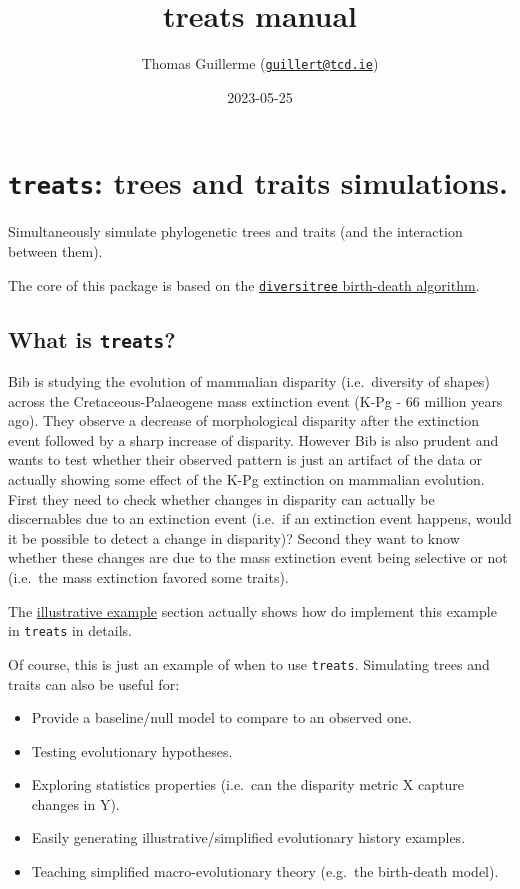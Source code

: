 \documentclass[
]{book}
\title{treats manual}
\author{Thomas Guillerme (\href{mailto:guillert@tcd.ie}{\nolinkurl{guillert@tcd.ie}})}
\date{2023-05-25}
\providecommand{\tightlist}{%
  \setlength{\itemsep}{0pt}\setlength{\parskip}{0pt}}
\begin{document}
\maketitle

{
\setcounter{tocdepth}{1}
\tableofcontents
}
\hypertarget{treats-trees-and-traits-simulations.}{%
\chapter{\texorpdfstring{\texttt{treats}: trees and traits simulations.}{treats: trees and traits simulations.}}\label{treats-trees-and-traits-simulations.}}

Simultaneously simulate phylogenetic trees and traits (and the interaction between them).

The core of this package is based on the \href{https://github.com/cran/diversitree/blob/master/R/simulate-bd.R}{\texttt{diversitree} birth-death algorithm}.

\hypertarget{what-is-treats}{%
\section{\texorpdfstring{What is \texttt{treats}?}{What is treats?}}\label{what-is-treats}}

Bib is studying the evolution of mammalian disparity (i.e.~diversity of shapes) across the Cretaceous-Palaeogene mass extinction event (K-Pg - 66 million years ago).
They observe a decrease of morphological disparity after the extinction event followed by a sharp increase of disparity.
However Bib is also prudent and wants to test whether their observed pattern is just an artifact of the data or actually showing some effect of the K-Pg extinction on mammalian evolution.
First they need to check whether changes in disparity can actually be discernables due to an extinction event (i.e.~if an extinction event happens, would it be possible to detect a change in disparity)?
Second they want to know whether these changes are due to the mass extinction event being selective or not (i.e.~the mass extinction favored some traits).

The \protect\hyperlink{kpgexample}{illustrative example} section actually shows how do implement this example in \texttt{treats} in details.

Of course, this is just an example of when to use \texttt{treats}.
Simulating trees and traits can also be useful for:

\begin{itemize}
\tightlist
\item
  Provide a baseline/null model to compare to an observed one.
\item
  Testing evolutionary hypotheses.
\item
  Exploring statistics properties (i.e.~can the disparity metric X capture changes in Y).
\item
  Easily generating illustrative/simplified evolutionary history examples.
\item
  Teaching simplified macro-evolutionary theory (e.g.~the birth-death model).
\end{itemize}
\end{document}
